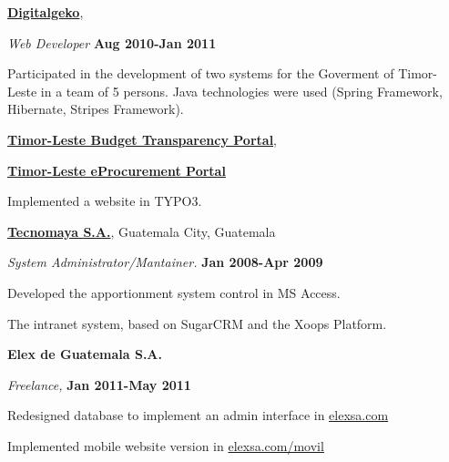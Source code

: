 \documentclass[10pt]{article}
\newenvironment{outerlist}[1][\enskip\textbullet]%
        {\begin{itemize}[#1]}{\end{itemize}%
         \vspace{-.6\baselineskip}}
\newenvironment{innerlist}[1][\enskip\textbullet]%
        {\begin{compactitem}[#1]}{\end{compactitem}}
\newcommand{\blankline}{\quad\pagebreak[2]}
\begin{document}
\href{http://www.digitalgeko.com/}{\textbf{Digitalgeko}}, 
\begin{outerlist}
\item[] \textit{Web Developer}%
        \hfill \textbf{Aug 2010-Jan 2011}
        \begin{innerlist}
        \item Participated in the development of two systems for the Goverment of Timor-Leste in a team of 5 persons. Java technologies were used (Spring Framework, Hibernate, Stripes Framework). 
          \begin{innerlist}
              \item \href{http://www.budgettransparency.gov.tl/public/index?&lang=en}{\textbf{Timor-Leste Budget Transparency Portal}},
              \item \href{http://www.eprocurement.gov.tl/public/indexeprtl?&lang=en}{\textbf{Timor-Leste eProcurement Portal}}
          \end{innerlist}
        \item Implemented a website in TYPO3.
        \end{innerlist}
\end{outerlist}

\blankline

\href{http://www.tecnomaya.net/}{\textbf{Tecnomaya S.A.}}, 
Guatemala City, Guatemala

\begin{outerlist}
\item[] \textit{System Administrator/Mantainer.}%
        \hfill \textbf{Jan 2008-Apr 2009}
        \begin{innerlist}
        \item Developed the apportionment system control in MS Access.
        \item The intranet system, based on SugarCRM and the Xoops Platform.
        \end{innerlist}
\end{outerlist}

\blankline

{\textbf{Elex de Guatemala S.A.}}
\begin{outerlist}
\item[] \textit{Freelance, } \hfill \textbf{Jan 2011-May 2011}
        \begin{innerlist}
        \item Redesigned database to implement an admin interface in \href{http://elexsa.com}{elexsa.com}
        \item Implemented mobile website version in \href{http://elexsa.com/movil}{elexsa.com/movil}
        \end{innerlist}
\end{outerlist}
\end{document}
